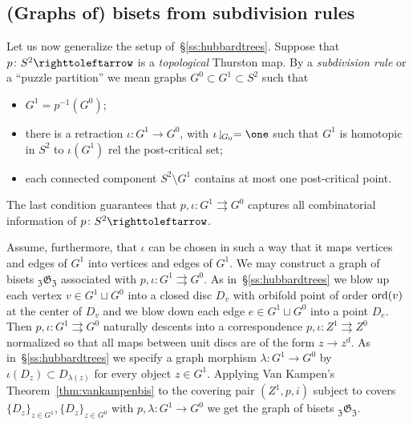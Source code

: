 \documentclass{amsart}
\begin{document}
\subsection{(Graphs of) bisets from subdivision rules}\label{ss:SubdRul}
Let us now generalize the setup of~\S\ref{ss:hubbardtrees}. Suppose that
$p\colon S^2\righttoleftarrow$ is a \emph{topological} Thurston map. By a
\emph{subdivision rule} or a ``puzzle partition'' we mean graphs
$G^0\subset G^1\subset S^2$ such that
\begin{itemize}
\item $G^1= p^{-1} (G^0)$;
\item there is a retraction $\iota\colon G^1\to G^0$, with
  $\iota\restrict{G_0}=\one$ such that $G^1$ is homotopic in $S^2$ to
  $\iota(G^1)$ rel the post-critical set;
\item each connected component $S^2\setminus G^1$ contains at most one
  post-critical point.
\end{itemize}
The last condition guarantees that $p,\iota\colon G^1 \rightrightarrows
G^0$ captures all combinatorial information of $p\colon
S^2\righttoleftarrow$.

Assume, furthermore, that $\iota$ can be chosen in such a way that it
maps vertices and edges of $G^1$ into vertices and edges of $G^1$.  We
may construct a graph of bisets
${}_{\mathfrak Z}{\mathfrak G}_{\mathfrak Z}$ associated with
$p,\iota\colon G^1 \rightrightarrows G^0$. As
in~\S\ref{ss:hubbardtrees} we blow up each vertex $v\in G^1\sqcup G^0$
into a closed disc $D_v$ with orbifold point of order $\operatorname{ord}(v)$ at the
center of $D_v$ and we blow down each edge $e\in G^1\sqcup G^0$ into a
point $D_e$. Then $p, \iota \colon G^1\rightrightarrows G^0$ naturally
descents into a correspondence
$p, \iota \colon Z^1\rightrightarrows Z^0$ normalized so that all maps
between unit discs are of the form $z\to z^d$. As
in~\S\ref{ss:hubbardtrees} we specify a graph morphism
$\lambda\colon G^1\to G^0$ by $\iota(D_z)\subset D_{\lambda(z)}$ for
every object $z\in G^1$. Applying Van Kampen's
Theorem~\ref{thm:vankampenbis} to the covering pair $(Z^1,p, i)$
subject to covers $\{D_z\}_{z\in G^1}, \{D_z\}_{z\in G^0}$ with
$p, \lambda\colon G^1\to G^0$ we get the graph of bisets
${}_{\mathfrak Z}{\mathfrak G}_{\mathfrak Z}$.
\end{document}
